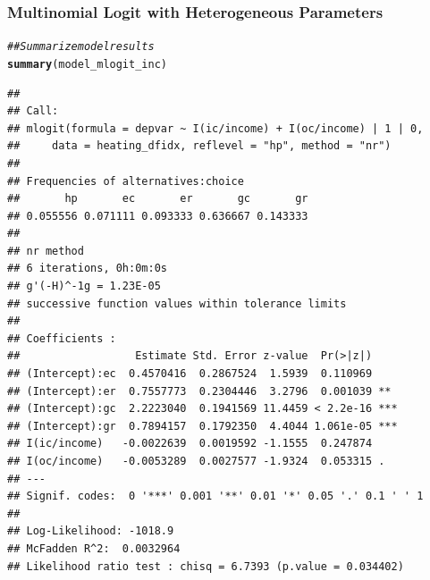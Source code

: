 \documentclass{beamer}\usepackage[]{graphicx}\usepackage[]{xcolor}
\makeatletter
\newcommand{\hlcom}[1]{\textcolor[rgb]{0.678,0.584,0.686}{\textit{#1}}}%
\newcommand{\hlstd}[1]{\textcolor[rgb]{0.345,0.345,0.345}{#1}}%
\newcommand{\hlkwd}[1]{\textcolor[rgb]{0.737,0.353,0.396}{\textbf{#1}}}%
\newenvironment{kframe}{%
 \def\at@end@of@kframe{}%
 \ifinner\ifhmode%
  \def\at@end@of@kframe{\end{minipage}}%
  \begin{minipage}{\columnwidth}%
 \fi\fi%
 \def\FrameCommand##1{\hskip\@totalleftmargin \hskip-\fboxsep
 \colorbox{shadecolor}{##1}\hskip-\fboxsep
     \hskip-\linewidth \hskip-\@totalleftmargin \hskip\columnwidth}%
 \MakeFramed {\advance\hsize-\width
   \@totalleftmargin\z@ \linewidth\hsize
   \@setminipage}}%
 {\par\unskip\endMakeFramed%
 \at@end@of@kframe}
\newenvironment{knitrout}{}{} %
\makeatother
\begin{document}
\begin{frame}[fragile]\frametitle{Multinomial Logit with Heterogeneous Parameters}
\begin{knitrout}\tiny
{}\color{fgcolor}\begin{kframe}
\begin{alltt}
\hlcom{## Summarize model results}
\hlkwd{summary}\hlstd{(model_mlogit_inc)}
\end{alltt}
\begin{verbatim}
## 
## Call:
## mlogit(formula = depvar ~ I(ic/income) + I(oc/income) | 1 | 0, 
##     data = heating_dfidx, reflevel = "hp", method = "nr")
## 
## Frequencies of alternatives:choice
##       hp       ec       er       gc       gr 
## 0.055556 0.071111 0.093333 0.636667 0.143333 
## 
## nr method
## 6 iterations, 0h:0m:0s 
## g'(-H)^-1g = 1.23E-05 
## successive function values within tolerance limits 
## 
## Coefficients :
##                  Estimate Std. Error z-value  Pr(>|z|)    
## (Intercept):ec  0.4570416  0.2867524  1.5939  0.110969    
## (Intercept):er  0.7557773  0.2304446  3.2796  0.001039 ** 
## (Intercept):gc  2.2223040  0.1941569 11.4459 < 2.2e-16 ***
## (Intercept):gr  0.7894157  0.1792350  4.4044 1.061e-05 ***
## I(ic/income)   -0.0022639  0.0019592 -1.1555  0.247874    
## I(oc/income)   -0.0053289  0.0027577 -1.9324  0.053315 .  
## ---
## Signif. codes:  0 '***' 0.001 '**' 0.01 '*' 0.05 '.' 0.1 ' ' 1
## 
## Log-Likelihood: -1018.9
## McFadden R^2:  0.0032964 
## Likelihood ratio test : chisq = 6.7393 (p.value = 0.034402)
\end{verbatim}
\end{kframe}
\end{knitrout}
\end{frame}
\end{document}
